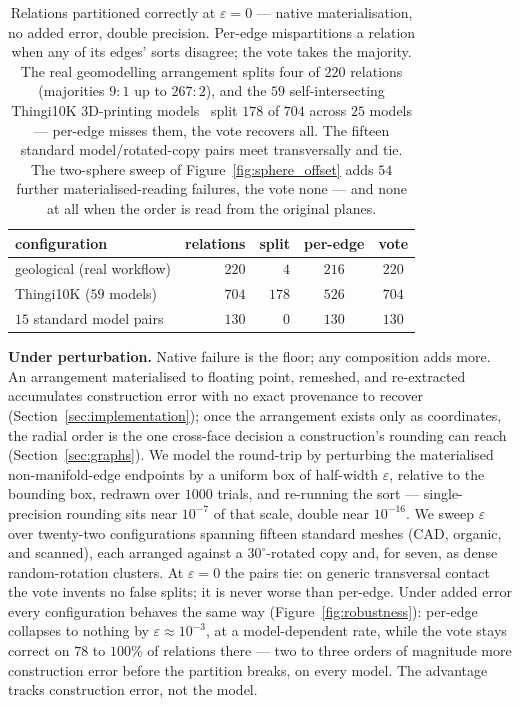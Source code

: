 \documentclass{egpubl}
\begin{document}
\begin{table}[t]
\centering
\caption{Relations partitioned correctly at $\varepsilon = 0$ --- native materialisation, no added error, double precision. Per-edge mispartitions a relation when any of its edges' sorts disagree; the vote takes the majority. The real geomodelling arrangement splits four of $220$ relations (majorities $9{:}1$ up to $267{:}2$), and the $59$ self-intersecting Thingi10K 3D-printing models~\cite{Thingi10K} split $178$ of $704$ across $25$ models --- per-edge misses them, the vote recovers all. The fifteen standard model/rotated-copy pairs meet transversally and tie. The two-sphere sweep of Figure~\ref{fig:sphere_offset} adds $54$ further materialised-reading failures, the vote none --- and none at all when the order is read from the original planes.}
\label{tab:eps0}
\begin{tabular*}{\columnwidth}{@{\extracolsep{\fill}}lrrcc@{}}
\toprule
configuration & relations & split & per-edge & vote \\
\midrule
geological (real workflow)        & $220$ & $4$   & $216$ & $220$ \\
Thingi10K ($59$ models)           & $704$ & $178$ & $526$ & $704$ \\
$15$ standard model pairs         & $130$ & $0$   & $130$ & $130$ \\
\bottomrule
\end{tabular*}
\end{table}

\textbf{Under perturbation.} Native failure is the floor; any composition adds more. An arrangement materialised to floating point, remeshed, and re-extracted accumulates construction error with no exact provenance to recover (Section~\ref{sec:implementation}); once the arrangement exists only as coordinates, the radial order is the one cross-face decision a construction's rounding can reach (Section~\ref{sec:graphs}). We model the round-trip by perturbing the materialised non-manifold-edge endpoints by a uniform box of half-width $\varepsilon$, relative to the bounding box, redrawn over $1000$ trials, and re-running the sort --- single-precision rounding sits near $10^{-7}$ of that scale, double near $10^{-16}$. We sweep $\varepsilon$ over twenty-two configurations spanning fifteen standard meshes (CAD, organic, and scanned), each arranged against a $30^\circ$-rotated copy and, for seven, as dense random-rotation clusters. At $\varepsilon = 0$ the pairs tie: on generic transversal contact the vote invents no false splits; it is never worse than per-edge. Under added error every configuration behaves the same way (Figure~\ref{fig:robustness}): per-edge collapses to nothing by $\varepsilon \approx 10^{-3}$, at a model-dependent rate, while the vote stays correct on $78$ to $100\%$ of relations there --- two to three orders of magnitude more construction error before the partition breaks, on every model. The advantage tracks construction error, not the model.
\end{document}
